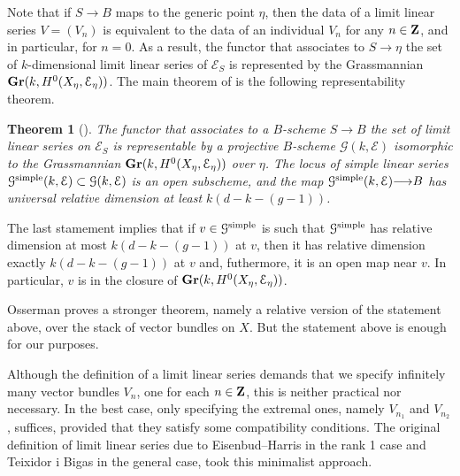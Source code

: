 \documentclass[11pt,reqno]{amsart}
\theoremstyle{plain}
\newtheorem{theorem}{Theorem}[section]
\theoremstyle{definition}
\theoremstyle{remark}
\numberwithin{equation}{section}
\renewcommand{\to}{{\longrightarrow}}
\numberwithin{equation}{section}
\begin{document}
Note that if $S \to B$ maps to the generic point $\eta$, then the data of a limit linear series $V = (V_n)$ is equivalent to the data of an individual $V_n$ for any $n \in {\bf Z}$, and in particular, for $n = 0$.
As a result, the functor that associates to $S \to \eta$ the set of $k$-dimensional limit linear series of $\mathcal E_S$ is represented by the Grassmannian ${\bf Gr}(k, H^0(X_\eta, \mathcal E_\eta))$.
The main theorem of \cite{oss:14} is the following representability theorem.
\begin{theorem}[{\cite[Theorem~3.4.7]{oss:14}}]
  \label{thm:lls}
  The functor that associates to a $B$-scheme $S \to B$ the set of limit linear series on $\mathcal E_S$ is representable by a projective $B$-scheme $\mathcal G(k, \mathcal E)$ isomorphic to the Grassmannian ${\bf Gr}(k, H^0(X_\eta, \mathcal E_\eta))$ over $\eta$.
  The locus of simple linear series ${\mathcal G}^{\rm simple}(k, \mathcal E) \subset {\mathcal G}(k, \mathcal E)$ is an open subscheme, and the map ${\mathcal G}^{\rm simple}(k, \mathcal E) \to B$ has universal relative dimension at least $k(d-k-(g-1))$.
\end{theorem}
The last stamement implies that if $v \in {\mathcal G}^{\rm simple}$ is such that ${\mathcal G}^{\rm simple}$ has relative dimension at most $k(d-k-(g-1))$ at $v$, then it has relative dimension exactly $k(d-k-(g-1))$ at $v$ and, futhermore, it is an open map near $v$.
In particular, $v$ is in the closure of ${\bf Gr}(k, H^0(X_\eta, \mathcal E_\eta))$.
\begin{remark}
  Osserman proves a stronger theorem, namely a relative version of the statement above, over the stack of vector bundles on $X$.
  But the statement above is enough for our purposes.  
\end{remark}

Although the definition of a limit linear series demands that we specify infinitely many vector bundles $V_n$, one for each $n \in {\bf Z}$, this is neither practical nor necessary.
In the best case, only specifying the extremal ones, namely $V_{n_1}$ and $V_{n_2}$, suffices, provided that they satisfy some compatibility conditions.
The original definition of limit linear series due to Eisenbud--Harris \cite{eis.har:86} in the rank 1 case and Teixidor i Bigas \cite{tei-i-big:91} in the general case, took this minimalist approach.
\end{document}
